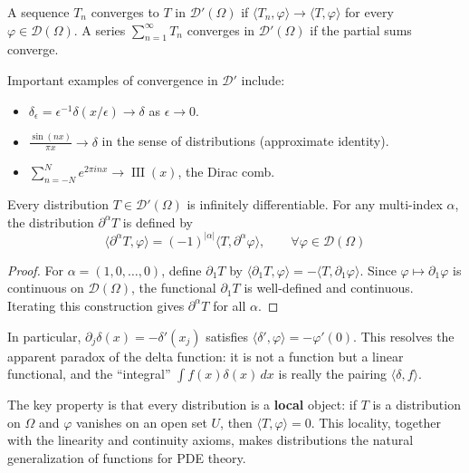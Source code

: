 \begin{definition}
A sequence $T_n$ converges to $T$ in $\mathcal{D}'(\Omega)$ if $\langle T_n, \varphi \rangle \to \langle T, \varphi \rangle$ for every $\varphi \in \mathcal{D}(\Omega)$. A series $\sum_{n=1}^\infty T_n$ converges in $\mathcal{D}'(\Omega)$ if the partial sums converge.
\end{definition}

\begin{example}
Important examples of convergence in $\mathcal{D}'$ include:
\begin{itemize}
\item $\delta_\epsilon = \epsilon^{-1}\delta(x/\epsilon) \to \delta$ as $\epsilon \to 0$.
\item $\frac{\sin(nx)}{\pi x} \to \delta$ in the sense of distributions (approximate identity).
\item $\sum_{n=-N}^N e^{2\pi i n x} \to \operatorname{III}(x)$, the Dirac comb.
\end{itemize}
\end{example}

\begin{theorem}\label{thm:distributions_differential}
Every distribution $T \in \mathcal{D}'(\Omega)$ is infinitely differentiable. For any multi-index $\alpha$, the distribution $\partial^\alpha T$ is defined by
\[\langle \partial^\alpha T, \varphi \rangle = (-1)^{|\alpha|} \langle T, \partial^\alpha \varphi \rangle, \qquad \forall \varphi \in \mathcal{D}(\Omega)\]
\end{theorem}

\begin{proof}
For $\alpha = (1,0,\ldots,0)$, define $\partial_1 T$ by $\langle \partial_1 T, \varphi \rangle = -\langle T, \partial_1 \varphi \rangle$. Since $\varphi \mapsto \partial_1 \varphi$ is continuous on $\mathcal{D}(\Omega)$, the functional $\partial_1 T$ is well-defined and continuous. Iterating this construction gives $\partial^\alpha T$ for all $\alpha$.
\end{proof}

In particular, $\partial_j \delta(x) = -\delta'(x_j)$ satisfies $\langle \delta', \varphi \rangle = -\varphi'(0)$. This resolves the apparent paradox of the delta function: it is not a function but a linear functional, and the ``integral'' $\int f(x)\delta(x) \, dx$ is really the pairing $\langle \delta, f \rangle$.

The key property is that every distribution is a \textbf{local} object: if $T$ is a distribution on $\Omega$ and $\varphi$ vanishes on an open set $U$, then $\langle T, \varphi \rangle = 0$. This locality, together with the linearity and continuity axioms, makes distributions the natural generalization of functions for PDE theory.

